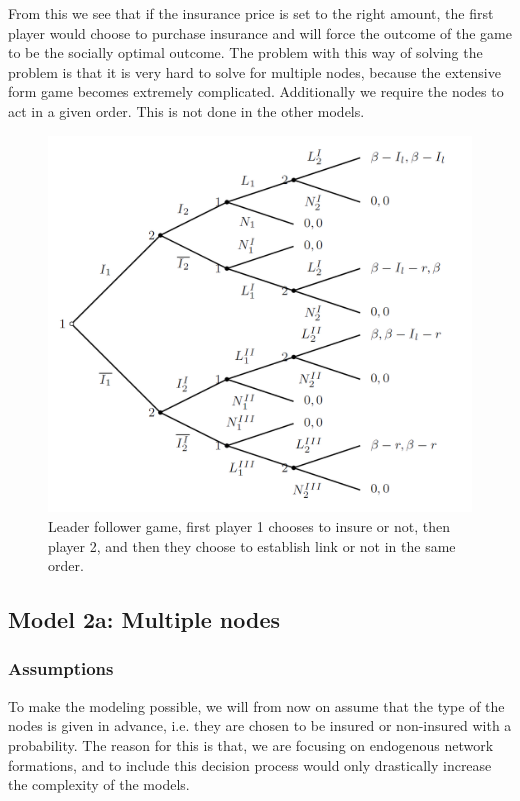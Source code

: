 From this we see that if the insurance price is set to the right amount, the first player would choose to purchase insurance and will force the outcome of the game to be the socially optimal outcome. 
The problem with this way of solving the problem is that it is very hard to solve for  multiple nodes, because the extensive form game becomes extremely complicated. Additionally we require the nodes to act in a given order. This is not done in the other models.
 

\begin{figure}[h]
\centering
  \includegraphics[width=0.9\linewidth]{../Figures/stackelberggame.png}
  \caption{\label{fig:stackelberg} Leader follower game, first player 1 chooses to insure or not, then player 2, and then they choose to establish link or not in the same order.}
\end{figure}


\subsection{Model 2a: Multiple nodes}
\subsubsection{Assumptions}
To make the modeling possible, we will from now on assume that the type of the nodes is given in advance, i.e. they are chosen to be insured or non-insured with a probability. The reason for this is that, we are focusing on endogenous network formations, and to include this decision process would only drastically increase the complexity of the models. 

